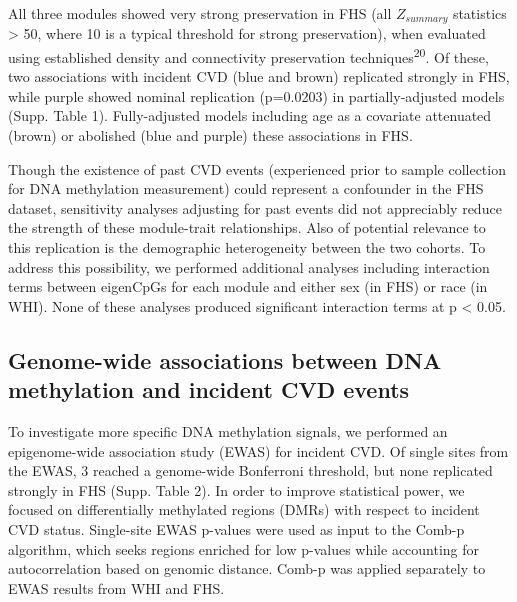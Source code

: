 \documentclass[]{article}
\theoremstyle{definition}
\theoremstyle{definition}
\theoremstyle{definition}
\theoremstyle{remark}
\begin{document}
All three modules showed very strong preservation in FHS (all
\(Z_{summary}\) statistics \textgreater{} 50, where 10 is a typical
threshold for strong preservation), when evaluated using established
density and connectivity preservation techniques\textsuperscript{20}. Of
these, two associations with incident CVD (blue and brown) replicated
strongly in FHS, while purple showed nominal replication
(p=0.0203) in partially-adjusted models (Supp. Table 1). Fully-adjusted
models including age as a covariate attenuated (brown) or abolished
(blue and purple) these associations in FHS.

Though the existence of past CVD events (experienced prior to sample
collection for DNA methylation measurement) could represent a confounder
in the FHS dataset, sensitivity analyses adjusting for past events did
not appreciably reduce the strength of these module-trait relationships.
Also of potential relevance to this replication is the demographic
heterogeneity between the two cohorts. To address this possibility, we
performed additional analyses including interaction terms between
eigenCpGs for each module and either sex (in FHS) or race (in WHI). None
of these analyses produced significant interaction terms at p
\textless{} 0.05.

\subsection{Genome-wide associations between DNA methylation and
incident CVD
events}\label{genome-wide-associations-between-dna-methylation-and-incident-cvd-events}

To investigate more specific DNA methylation signals, we performed an
epigenome-wide association study (EWAS) for incident CVD. Of single
sites from the EWAS, 3 reached a genome-wide Bonferroni threshold, but
none replicated strongly in FHS (Supp. Table 2). In order to improve
statistical power, we focused on differentially methylated regions
(DMRs) with respect to incident CVD status. Single-site EWAS p-values
were used as input to the Comb-p algorithm, which seeks regions enriched
for low p-values while accounting for autocorrelation based on genomic
distance. Comb-p was applied separately to EWAS results from WHI and
FHS.
\end{document}
